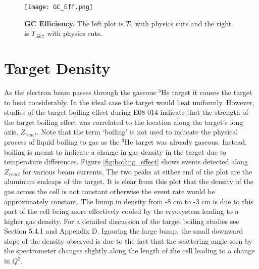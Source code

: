 \begin{figure}[!ht]
\begin{center}
\texttt{[image: GC\_Eff.png]}
\end{center}
\caption[GC Efficiency]{
{\bf{GC Efficiency.}} The left plot is $T_7$ with physics cuts and the right is $T_{3\&7}$ with physics cuts.}
\label{fig:gc_eff}
\end{figure}

\section{Target Density}
\label{sec:density}

As the electron beam passes through the gaseous $^3$He target it causes the target to heat considerably. In the ideal case the target would heat uniformly. However, studies of the target boiling effect during E08-014 indicate that the strength of the target boiling effect was correlated to the location along the target's long axis, $Z_{react}$. Note that the term `boiling' is not used to indicate the physical process of liquid boiling to gas as the $^3$He target was already gaseous. Instead, boiling is meant to indicate a change in gas density in the target due to temperature differences. Figure \ref{fig:boiling_effect} shows events detected along $Z_{react}$ for various beam currents. The two peaks at either end of the plot are the aluminum endcaps of the target. It is clear from this plot that the density of the gas across the cell is not constant otherwise the event rate would be approximately constant. The bump in density from -8 cm to -3 cm is due to this part of the cell being more effectively cooled by the cryosystem leading to a higher gas density. For a detailed discussion of the target boiling studies see \cite{Thesis:Ye} Section 5.4.1 and Appendix D. Ignoring the large bump, the small downward slope of the density observed is due to the fact that the scattering angle seen by the spectrometer changes slightly along the length of the cell leading to a change in $Q^2$.  

